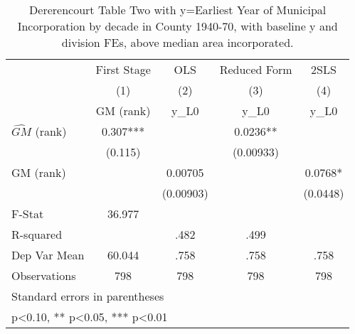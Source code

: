 \begin{table}[htbp]\centering
\def\sym#1{\ifmmode^{#1}\else\(^{#1}\)\fi}
\caption{Dererencourt Table Two with y=Earliest Year of Municipal Incorporation by decade in County 1940-70, with baseline y and division FEs, above median area incorporated.}
\begin{tabular}{l*{4}{c}}
\toprule
                    & First Stage   &         OLS   &Reduced Form   &        2SLS   \\
                    &\multicolumn{1}{c}{(1)}&\multicolumn{1}{c}{(2)}&\multicolumn{1}{c}{(3)}&\multicolumn{1}{c}{(4)}\\
                    &\multicolumn{1}{c}{GM  (rank)}&\multicolumn{1}{c}{y\_L0}&\multicolumn{1}{c}{y\_L0}&\multicolumn{1}{c}{y\_L0}\\
\midrule
$\hat{GM}$ (rank)   &       0.307***&               &      0.0236** &               \\
                    &     (0.115)   &               &   (0.00933)   &               \\
\addlinespace
GM  (rank)          &               &     0.00705   &               &      0.0768*  \\
                    &               &   (0.00903)   &               &    (0.0448)   \\
\midrule
F-Stat              &      36.977   &               &               &               \\
R-squared           &               &        .482   &        .499   &               \\
Dep Var Mean        &      60.044   &        .758   &        .758   &        .758   \\
Observations        &         798   &         798   &         798   &         798   \\
\bottomrule
\multicolumn{5}{l}{\footnotesize Standard errors in parentheses}\\
\multicolumn{5}{l}{\footnotesize * p<0.10, ** p<0.05, *** p<0.01}\\
\end{tabular}
\end{table}
